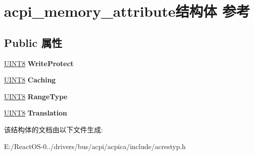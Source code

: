 \hypertarget{structacpi__memory__attribute}{}\section{acpi\+\_\+memory\+\_\+attribute结构体 参考}
\label{structacpi__memory__attribute}
\subsection*{Public 属性}
\begin{DoxyCompactItemize}
\item 
\mbox{\label{structacpi__memory__attribute_abf3358ee09f118bb4e35bd41e4c25f0e}} 
\hyperlink{_processor_bind_8h_ab27e9918b538ce9d8ca692479b375b6a}{U\+I\+N\+T8} {\bfseries Write\+Protect}
\item 
\mbox{\label{structacpi__memory__attribute_a3119248c5a9f5e3ccafab6ba834db16f}} 
\hyperlink{_processor_bind_8h_ab27e9918b538ce9d8ca692479b375b6a}{U\+I\+N\+T8} {\bfseries Caching}
\item 
\mbox{\label{structacpi__memory__attribute_a1e42de181dc7848a3dc634b4a066fd6d}} 
\hyperlink{_processor_bind_8h_ab27e9918b538ce9d8ca692479b375b6a}{U\+I\+N\+T8} {\bfseries Range\+Type}
\item 
\mbox{\label{structacpi__memory__attribute_adab30981b6d0b54e8011bd6a10a1f3f0}} 
\hyperlink{_processor_bind_8h_ab27e9918b538ce9d8ca692479b375b6a}{U\+I\+N\+T8} {\bfseries Translation}
\end{DoxyCompactItemize}


该结构体的文档由以下文件生成\+:\begin{DoxyCompactItemize}
\item 
E\+:/\+React\+O\+S-\/0../drivers/bus/acpi/acpica/include/acrestyp.\+h\end{DoxyCompactItemize}
